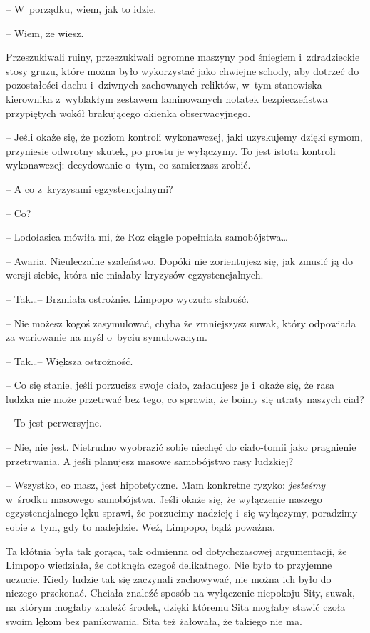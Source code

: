 \documentclass[oneside,polish,11pt,sfheadings]{mwbk}
\begin{document}
-- W~porządku, wiem, jak to idzie.

-- Wiem, że wiesz.

Przeszukiwali ruiny, przeszukiwali ogromne maszyny pod śniegiem i~zdradzieckie stosy gruzu, które można było wykorzystać jako chwiejne
schody, aby dotrzeć do pozostałości dachu i~dziwnych zachowanych
reliktów, w~tym stanowiska kierownika z~wyblakłym zestawem laminowanych
notatek bezpieczeństwa przypiętych wokół brakującego okienka
obserwacyjnego.

-- Jeśli okaże się, że poziom kontroli wykonawczej, jaki uzyskujemy
dzięki symom, przyniesie odwrotny skutek, po prostu je wyłączymy. To
jest istota kontroli wykonawczej: decydowanie o~tym, co zamierzasz
zrobić.

-- A co z~kryzysami egzystencjalnymi?

-- Co?

-- Lodołasica mówiła mi, że Roz ciągle popełniała samobójstwa\ldots 

-- Awaria. Nieuleczalne szaleństwo. Dopóki nie zorientujesz się, jak zmusić ją do
wersji siebie, która nie miałaby kryzysów egzystencjalnych.

-- Tak\ldots  -- Brzmiała ostrożnie. Limpopo wyczuła słabość.

-- Nie możesz kogoś zasymulować, chyba że zmniejszysz suwak, który
odpowiada za wariowanie na myśl o~byciu symulowanym.

-- Tak\ldots  -- Większa ostrożność.

-- Co się stanie, jeśli porzucisz swoje ciało, załadujesz je i~okaże się,
że rasa ludzka nie może przetrwać bez tego, co sprawia, że boimy się
utraty naszych ciał?

-- To jest perwersyjne.

-- Nie, nie jest. Nietrudno wyobrazić sobie niechęć do ciało-tomii jako
pragnienie przetrwania. A jeśli planujesz masowe samobójstwo rasy
ludzkiej?

-- Wszystko, co masz, jest hipotetyczne. Mam konkretne ryzyko:
\textit{jesteśmy} w~środku masowego samobójstwa. Jeśli okaże się, że
wyłączenie naszego egzystencjalnego lęku sprawi, że porzucimy nadzieję i~się wyłączymy, poradzimy sobie z~tym, gdy to nadejdzie. Weź, Limpopo,
bądź poważna.

Ta kłótnia była tak gorąca, tak odmienna od dotychczasowej argumentacji,
że Limpopo wiedziała, że dotknęła czegoś delikatnego. Nie było to
przyjemne uczucie. Kiedy ludzie tak się zaczynali zachowywać, nie można
ich było do niczego przekonać. Chciała znaleźć sposób na wyłączenie
niepokoju Sity, suwak, na którym mogłaby znaleźć środek, dzięki któremu
Sita mogłaby stawić czoła swoim lękom bez panikowania. Sita też
żałowała, że takiego nie ma.
\end{document}
